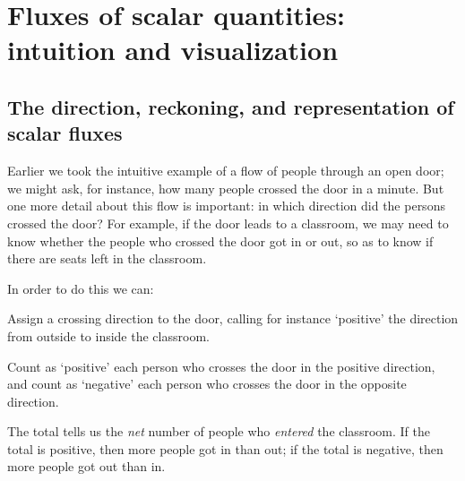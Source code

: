 \documentclass[a4paper,12pt,%
onecolumn,oneside,titlepage,%
british%
]{memoir}
\renewcommand*{\|}[1][]{\nonscript\:#1\vert\nonscript\:\mathopen{}}
\begin{document}
\section{Fluxes of scalar quantities: intuition and visualization}
\label{sec:intuition_fluxes_scalar}

\subsection{The direction, reckoning, and representation of scalar fluxes}
\label{sec:flux_scalar_direction}

Earlier we took the intuitive example of a flow of people through an open door; we might ask, for instance, how many people crossed the door in a minute. But one more detail about this flow is important: in which direction did the persons crossed the door? For example, if the door leads to a classroom, we may need to know whether the people who crossed the door got in or out, so as to know if there are seats left in the classroom.

In order to do this we can:
\begin{enumerate*}[label=\arabic*.]
\item Assign a crossing direction to the door, calling for instance \enquote*{positive} the direction from outside to inside the classroom.
\item Count as \enquote*{positive} each person who crosses the door in the positive direction, and count as \enquote*{negative} each person who crosses the door in the opposite direction.
\end{enumerate*}
The total tells us the \emph{net} number of people who \emph{entered} the classroom.
If the total is positive, then more people got in than out; if the total is negative, then more people got out than in.
\end{document}
